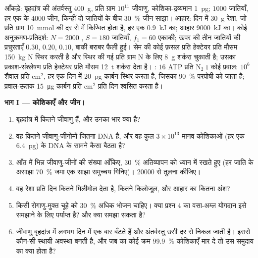 \begin{problem}
\label{pb:b3:microbiomes:1}
आँकड़े: बृहदांत्र की अंतर्वस्तु \qty{400}{g}, प्रति ग्राम $10^{11}$
जीवाणु, कोशिका-द्रव्यमान \qty{1}{pg}; $1000$ जातियाँ, हर एक के
\num{4000} जीन, किन्हीं दो जातियों के बीच \qty{30}{\%} जीन साझा।
आहार: दिन में \qty{30}{g} रेशा, जो प्रति ग्राम \qty{10}{mmol} की दर से
 में किण्वित होता है, हर एक \qty{0.9}{kJ} का;
आहार \qty{9000}{kJ} का। कोई अनुक्रमण-प्रतिदर्श: $N = 2000$ ,
$S = 180$ जातियाँ, $f_{1} = 60$ एकाकी; ऊपर की तीन जातियों की प्रचुरताएँ
$0.30$, $0.20$, $0.10$, बाकी बराबर फैली हुई। सेम की कोई फ़सल प्रति
हेक्टेयर प्रति मौसम \qty{150}{kg} N स्थिर करती है और स्थिर की गई प्रति
ग्राम N के लिए \qty{8}{g} शर्करा चुकाती है; उसका प्रकाश-संश्लेषण प्रति
हेक्टेयर प्रति मौसम \qty{12}{t} शर्करा देता है। : $16$ ATP
प्रति N$_{2}$। कोई प्रवाल: $10^{6}$ शैवाल प्रति cm$^{2}$, हर एक दिन
में \qty{20}{pg} कार्बन स्थिर करता है, जिसका \qty{90}{\%} परपोषी को
जाता है; प्रवाल-ऊतक \qty{15}{\micro g} कार्बन प्रति cm$^{2}$ प्रति दिन
श्वसित करता है।

\medskip
\noindent\textbf{भाग I --- कोशिकाएँ और जीन।}
\begin{enumerate}
  \item बृहदांत्र में कितने जीवाणु हैं, और उनका भार क्या है?
  \item वह कितने जीवाणु-जीनोमों जितना DNA है, और वह कुल
        $3\times 10^{13}$ मानव कोशिकाओं (हर एक \qty{6.4}{pg}) के DNA
        के सामने कैसा बैठता है?
  \item आँत में भिन्न जीवाणु-जीनों की संख्या आँकिए, \qty{30}{\%}
        अतिव्यापन को ध्यान में रखते हुए (हर जाति के असाझा \qty{70}{\%}
        जमा एक साझा समुच्चय गिनिए)। \num{20000} से तुलना कीजिए।
  \item वह रेशा प्रति दिन कितने मिलीमोल  देता है,
        कितने किलोजूल, और आहार का कितना अंश?
  \item किसी रोगाणु-मुक्त चूहे को \qty{30}{\%} अधिक भोजन चाहिए। क्या
        प्रश्न 4 का वसा-अम्ल योगदान इसे समझाने के लिए पर्याप्त है? और
        क्या समझा सकता है?
  \item जीवाणु बृहदांत्र में लगभग दिन में एक बार बँटते हैं और
        अंतर्वस्तु उसी दर से निकल जाती है। इससे कौन-सी स्थायी अवस्था
        बनती है, और जब  का कोई क्रम \qty{99.9}{\%}
        कोशिकाएँ मार दे तो उस समुदाय का क्या होता है?
\end{enumerate}


\end{problem}
